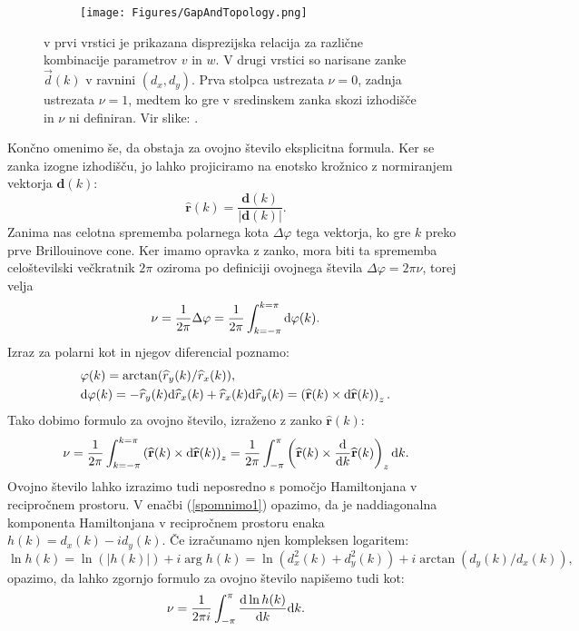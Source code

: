 \begin{figure}[!h]
\centering
\begin{subfigure}{.9\textwidth}
\texttt{[image: Figures/GapAndTopology.png]}
\end{subfigure}
\caption{v prvi vrstici je prikazana disprezijska relacija za različne kombinacije parametrov $v$ in $w$. V drugi vrstici so narisane zanke $\vec{d}(k)$ v ravnini $(d_x , d_y)$. Prva stolpca ustrezata $\nu = 0$, zadnja ustrezata $\nu = 1$, medtem ko gre v sredinskem zanka skozi izhodišče in $\nu$ ni definiran. Vir slike: \cite{madzar}.}
\label{fig:examples}
\end{figure}

Končno omenimo še, da obstaja za ovojno število eksplicitna formula.
Ker se zanka izogne izhodišču, jo lahko projiciramo na enotsko krožnico z normiranjem vektorja $\mathbf{d}(k)$:
\begin{equation}
\widehat{\mathbf{r}}(k) = \frac{\mathbf{d}(k)}{|\mathbf{d}(k)|}.
\end{equation}
Zanima nas celotna sprememba polarnega kota $\Delta \varphi$ tega vektorja, ko gre $k$ preko prve Brillouinove cone. Ker imamo opravka z zanko, mora biti ta sprememba celoštevilski večkratnik $2 \pi$ oziroma po definiciji ovojnega števila $\Delta \varphi = 2 \pi \nu$, torej velja
\begin{equation}
\nu = \frac{1}{2  \pi} \Delta \varphi = \frac{1}{2 \pi} \int_{k=-\pi}^{k=\pi} \textup{d}\varphi(k).
\end{equation}
Izraz za polarni kot in njegov diferencial poznamo:
\begin{align}
&\varphi(k) = \arctan (\widehat{r}_y(k) / \widehat{r}_x(k)), \\
&\textup{d} \varphi(k) = - \widehat{r}_y(k) \textup{d} \widehat{r}_x(k) +  \widehat{r}_x(k) \textup{d} \widehat{r}_y(k) = \left( \widehat{\mathbf{r}}(k) \times \textup{d} \widehat{\mathbf{r}}(k) \right)_z.
\end{align}
Tako dobimo formulo za ovojno število, izraženo z zanko $\widehat{\mathbf{r}}(k)$:
\begin{equation}
\nu = \frac{1}{2 \pi} \int_{k=- \pi}^{k= \pi}  \left( \widehat{\mathbf{r}}(k) \times \textup{d} \widehat{\mathbf{r}}(k) \right)_z = \frac{1}{2 \pi} \int_{-\pi}^{ \pi} \left ( \widehat{\mathbf{r}}(k) \times \frac{\textup{d}}{\textup{d} k} \widehat{\mathbf{r}}(k) \right)_z \textup{d}k.
\end{equation}
Ovojno število lahko izrazimo tudi neposredno s pomočjo Hamiltonjana v recipročnem prostoru. V enačbi (\ref{spomnimo1}) opazimo, da je naddiagonalna komponenta Hamiltonjana v recipročnem prostoru enaka
$h(k) = d_x (k) - i d_y(k)$. Če izračunamo njen kompleksen logaritem:
\begin{equation}
\ln h(k) = \ln (|h(k)|) + i \arg h(k) = \ln(d_x^2(k) + d_y^2(k)) + i \arctan (d_y(k) / d_x(k)),
\end{equation}
opazimo, da lahko zgornjo formulo za ovojno število napišemo tudi kot:
\begin{equation}
\nu = \frac{1}{2 \pi i} \int_{- \pi}^\pi \frac{\textup{d}  \ln h(k) }{\textup{d} k}\textup{d}k.
\end{equation}
\newpage
